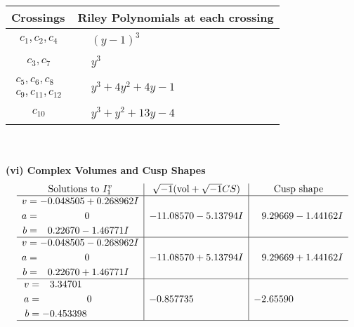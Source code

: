 \documentclass[1p]{elsarticle_modified}
\theoremstyle{definition}
\newcommand{\I}{\sqrt{-1}}
\begin{document}
\begin{tabular}{m{50pt}|m{274pt}}
Crossings & \hspace{64pt}Riley Polynomials at each crossing \\
\hline $$\begin{aligned}c_{1},c_{2},c_{4}\end{aligned}$$&$\begin{aligned}
&(y-1)^3
\end{aligned}$\\
\hline $$\begin{aligned}c_{3},c_{7}\end{aligned}$$&$\begin{aligned}
&y^3
\end{aligned}$\\
\hline $$\begin{aligned}c_{5},c_{6},c_{8}\\c_{9},c_{11},c_{12}\end{aligned}$$&$\begin{aligned}
&y^3+4 y^2+4 y-1
\end{aligned}$\\
\hline $$\begin{aligned}c_{10}\end{aligned}$$&$\begin{aligned}
&y^3+y^2+13 y-4
\end{aligned}$\\
\hline
\end{tabular}\\~\\
\newpage\flushleft \textbf{(vi) Complex Volumes and Cusp Shapes}
$$\begin{array}{c|c|c}  
\text{Solutions to }I^v_{1}& \I (\text{vol} + \sqrt{-1}CS) & \text{Cusp shape}\\
 \hline 
\begin{aligned}
v &= -0.048505 + 0.268962 I \\
a &= \phantom{-0.000000 } 0 \\
b &= \phantom{-}0.22670 - 1.46771 I\end{aligned}
 & -11.08570 - 5.13794 I & \phantom{-}9.29669 - 1.44162 I \\ \hline\begin{aligned}
v &= -0.048505 - 0.268962 I \\
a &= \phantom{-0.000000 } 0 \\
b &= \phantom{-}0.22670 + 1.46771 I\end{aligned}
 & -11.08570 + 5.13794 I & \phantom{-}9.29669 + 1.44162 I \\ \hline\begin{aligned}
v &= \phantom{-}3.34701\phantom{ +0.000000I} \\
a &= \phantom{-0.000000 } 0 \\
b &= -0.453398\phantom{ +0.000000I}\end{aligned}
 & -0.857735\phantom{ +0.000000I} & -2.65590\phantom{ +0.000000I}\\
 \hline 
 \end{array}$$\newpage\newpage\renewcommand{\arraystretch}{1}
\end{document}
